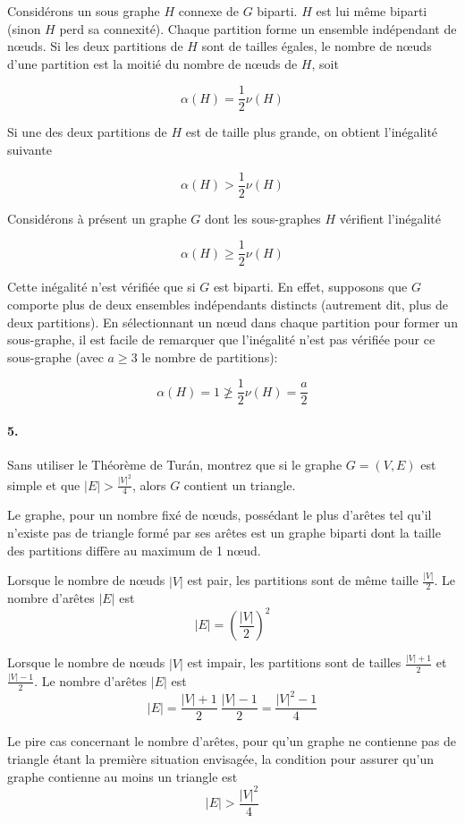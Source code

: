 \begin{solution}
Considérons un sous graphe $H$ connexe de $G$ biparti. $H$ est lui même biparti (sinon $H$ perd sa connexité).
Chaque partition forme un ensemble indépendant de nœuds. Si les deux partitions de $H$ sont de tailles égales, le nombre de nœuds d'une partition est la moitié du nombre de nœuds de $H$, soit

$$\alpha(H)=\frac{1}{2}\nu(H)$$

Si une des deux partitions de $H$ est de taille plus grande, on obtient l'inégalité suivante

$$\alpha(H)>\frac{1}{2}\nu(H)$$

Considérons à présent un graphe $G$ dont les sous-graphes $H$ vérifient l'inégalité

$$\alpha(H)\geqslant\frac{1}{2}\nu(H)$$

Cette inégalité n'est vérifiée que si $G$ est biparti. En effet, supposons que $G$ comporte plus de deux ensembles indépendants distincts (autrement dit, plus de deux partitions). En sélectionnant un nœud dans chaque partition pour former un sous-graphe, il est facile de remarquer que l'inégalité n'est pas vérifiée pour ce sous-graphe (avec $a\geqslant3$ le nombre de partitions):

$$\alpha(H)=1\ngeqslant\frac{1}{2}\nu(H)=\frac{a}{2}$$
\end{solution}

\paragraph{5. } Sans utiliser le Théorème de Turán, montrez que si le graphe $G = (V, E)$ est simple et que $|E| > \frac{|V|^2}{4}$, alors $G$ contient un triangle.

\begin{solution}
Le graphe, pour un nombre fixé de nœuds, possédant le plus d'arêtes tel qu'il n'existe pas de triangle formé par ses arêtes est un graphe biparti dont la taille des partitions diffère au maximum de 1 nœud.

Lorsque le nombre de nœuds $|V|$ est pair, les partitions sont de même taille $\frac{|V|}{2}$. Le nombre d'arêtes $|E|$ est $$|E|=\left(\frac{|V|}{2}\right)^2$$

Lorsque le nombre de nœuds $|V|$ est impair, les partitions sont de tailles $\frac{|V|+1}{2}$ et $\frac{|V|-1}{2}$. Le nombre d'arêtes $|E|$ est $$|E|=\frac{|V|+1}{2}~\frac{|V|-1}{2}=\frac{|V|^2-1}{4}$$

Le pire cas concernant le nombre d'arêtes, pour qu'un graphe ne contienne pas de triangle étant la première situation envisagée, la condition pour assurer qu'un graphe contienne au moins un triangle est $$|E|>\frac{|V|^2}{4}$$
\end{solution}
